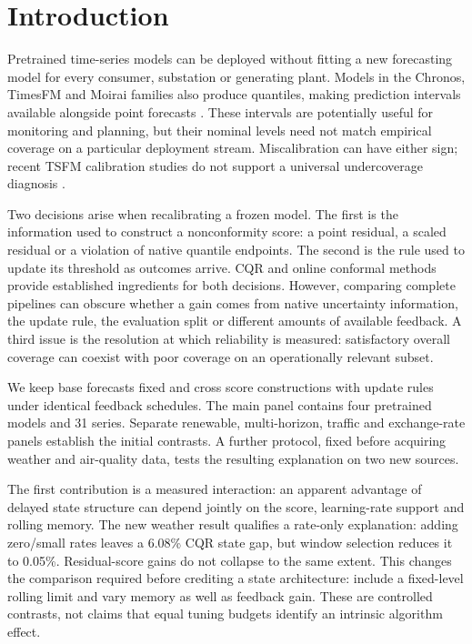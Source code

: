 \documentclass[preprint,11pt]{elsarticle}
\begin{document}
\section{Introduction}
Pretrained time-series models can be deployed without fitting a new forecasting model
for every consumer, substation or generating plant. Models in the Chronos, TimesFM and
Moirai families also produce quantiles, making prediction intervals available alongside
point forecasts \citep{ansari2024chronos,das2024timesfm,ansari2025chronos2,liu2025moirai2}.
These intervals are potentially useful for monitoring and planning, but their nominal
levels need not match empirical coverage on a particular deployment stream. Miscalibration
can have either sign; recent TSFM calibration studies do not support a universal
undercoverage diagnosis \citep{adler2025calibration}.

Two decisions arise when recalibrating a frozen model. The first is the information
used to construct a nonconformity score: a point residual, a scaled residual or a violation
of native quantile endpoints. The second is the rule used to update its threshold as
outcomes arrive. CQR \citep{romano2019cqr} and online conformal methods
\citep{gibbs2021aci,zaffran2022acits,bhatnagar2023saocp,angelopoulos2023pid,gibbs2024dtaci}
provide established ingredients for both decisions. However, comparing complete pipelines
can obscure whether a gain comes from native uncertainty information, the update rule,
the evaluation split or different amounts of available feedback. A third issue is the
resolution at which reliability is measured: satisfactory overall coverage can coexist
with poor coverage on an operationally relevant subset.

We keep base forecasts fixed and cross score constructions with update rules under
identical feedback schedules. The main panel contains four pretrained models and 31
series. Separate renewable, multi-horizon, traffic and exchange-rate panels establish
the initial contrasts. A further protocol, fixed before acquiring weather and air-quality
data, tests the resulting explanation on two new sources.

The first contribution is a measured interaction: an apparent advantage of delayed
state structure can depend jointly on the score, learning-rate support and rolling
memory. The new weather result qualifies a rate-only explanation: adding zero/small
rates leaves a 6.08\% CQR state gap, but window selection reduces it to 0.05\%.
Residual-score gains do not collapse to the same extent. This changes the comparison
required before crediting a state architecture: include a fixed-level rolling limit
and vary memory as well as feedback gain. These are controlled contrasts, not claims
that equal tuning budgets identify an intrinsic algorithm effect.
\end{document}
